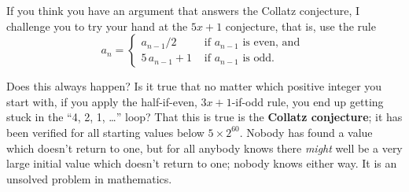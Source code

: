 \documentclass{ximera}
\newcommand{\defnword}[1]{\textbf{#1}}
\begin{document}
If you think you have an argument that answers the Collatz conjecture, I challenge you to try your hand at the $5x+1$ conjecture, that is, use the rule
\[
a_n = \displaystyle\begin{cases} a_{n-1} / 2 & \mbox{ if $a_{n-1}$ is even, and } \\
5 \, a_{n-1} + 1 & \mbox{ if $a_{n-1}$ is odd.}
\end{cases}
\]

Does this always happen?  Is it true that no matter which positive
integer you start with, if you apply the half-if-even, $3x+1$-if-odd
rule, you end up getting stuck in the ``4, 2, 1, \ldots'' loop?  That
this is true is the \defnword{Collatz conjecture}; it has been
verified for all starting values below $5 \times 2^{60}$.  Nobody has
found a value which doesn't return to one, but for all anybody knows
there \textit{might} well be a very large initial value which doesn't
return to one; nobody knows either way.  It is an unsolved
problem in mathematics.
\end{document}
